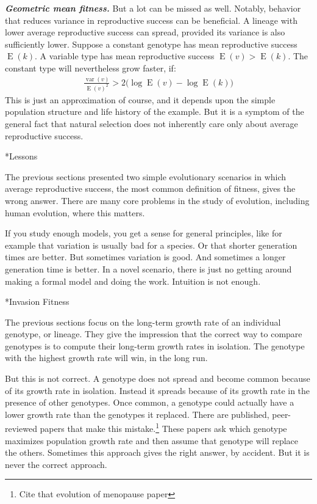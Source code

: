 \documentclass[10pt,reqno]{amsbook}
\makeatletter
\DeclareMathOperator{\var}{var}
\DeclareMathOperator{\E}{E}
\renewcommand\section{\@startsection{section}{1}
\z@{.7\linespacing\@plus\linespacing}{.5\linespacing}
{\large\bfseries\itshape}}
\numberwithin{equation}{chapter}
\newenvironment{mathboxmp}[1]
{\begin{tcolorbox}[breakable, enhanced, oversize]\footnotesize\noindent\textbf{\emph{#1}}}
{\end{tcolorbox}}
\makeatother
\begin{document}
\begin{mathboxmp}{Geometric mean fitness.}
But a lot can be missed as well. Notably, behavior that reduces variance in reproductive success can be beneficial. A lineage with lower average reproductive success can spread, provided its variance is also sufficiently lower. Suppose a constant genotype has mean reproductive success $\E(k)$. A variable type has mean reproductive success $\E(v) > \E(k)$. The constant type will nevertheless grow faster, if:
\begin{align*}
	\frac{\var(v)}{\E(v)^2} > 2 \big( \log \E(v) - \log \E(k) \big) 
\end{align*}
This is just an approximation of course, and it depends upon the simple population structure and life history of the example. But it is a symptom of the general fact that natural selection does not inherently care only about average reproductive success.
\end{mathboxmp}


\section*{Lessons}

The previous sections presented two simple evolutionary scenarios in which average reproductive success, the most common definition of fitness, gives the wrong answer. There are many core problems in the study of evolution, including human evolution, where this matters.

If you study enough models, you get a sense for general principles, like for example that variation is usually bad for a species. Or that shorter generation times are better. But sometimes variation is good. And sometimes a longer generation time is better. In a novel scenario, there is just no getting around making a formal model and doing the work. Intuition is not enough.

\section*{Invasion Fitness}

The previous sections focus on the long-term growth rate of an individual genotype, or lineage. They give the impression that the correct way to compare genotypes is to compute their long-term growth rates in isolation. The genotype with the highest growth rate will win, in the long run. 

But this is not correct. A genotype does not spread and become common because of its growth rate in isolation. Instead it spreads because of its growth rate in the presence of other genotypes. Once common, a genotype could actually have a lower growth rate than the genotypes it replaced. There are published, peer-reviewed papers that make this mistake.\footnote{Cite that evolution of menopause paper} These papers ask which genotype maximizes population growth rate and then assume that genotype will replace the others. Sometimes this approach gives the right answer, by accident. But it is never the correct approach.
\end{document}
